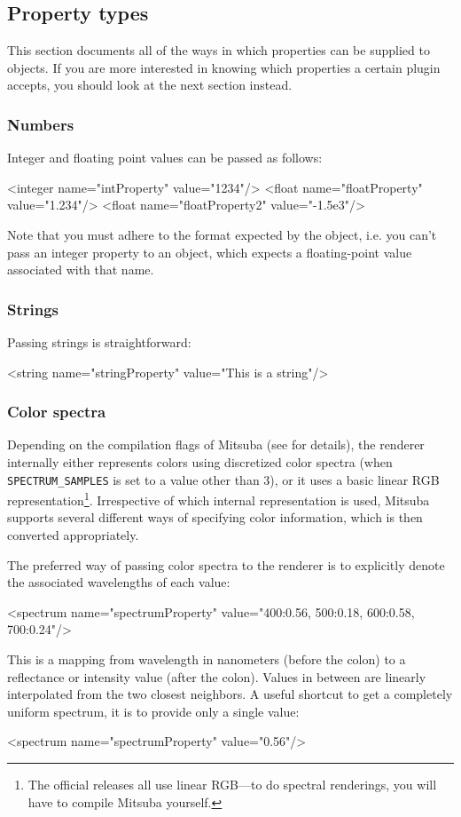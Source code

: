 \subsection{Property types}
This section documents all of the ways in which properties can be supplied to objects. If you are more
interested in knowing which properties a certain plugin accepts, you should look at the next section instead.
\subsubsection{Numbers}
Integer and floating point values can be passed as follows:
\begin{xml}
<integer name="intProperty" value="1234"/>
<float name="floatProperty" value="1.234"/>
<float name="floatProperty2" value="-1.5e3"/>
\end{xml}
Note that you must adhere to the format expected by the object, i.e. you can't pass an integer property
to an object, which expects a floating-point value associated with that name.
\subsubsection{Strings}
Passing strings is straightforward:
\begin{xml}
<string name="stringProperty" value="This is a string"/>
\end{xml}
\subsubsection{Color spectra}
\label{sec:format-spectra}
Depending on the compilation flags of Mitsuba (see  for
details), the renderer internally either represents colors using discretized color spectra
(when \texttt{SPECTRUM\_SAMPLES} is set to a value other than 3), or it
uses a basic linear RGB representation\footnote{The official
releases all use linear RGB---to do spectral renderings, you will have
to compile Mitsuba yourself.}.
Irrespective of which internal representation is used, Mitsuba supports
several different ways of specifying color information, which is then
converted appropriately.

The preferred way of passing color spectra to the renderer is to explicitly
denote the  associated wavelengths of each value:
\begin{xml}
<spectrum name="spectrumProperty" value="400:0.56, 500:0.18, 600:0.58, 700:0.24"/>
\end{xml}
This is a mapping from wavelength in nanometers (before the colon)
to a reflectance or intensity value (after the colon).
Values in between are linearly interpolated from the two closest neighbors.
A useful shortcut to get a completely uniform spectrum, it is to provide
only a single value:
\begin{xml}
<spectrum name="spectrumProperty" value="0.56"/>
\end{xml}

